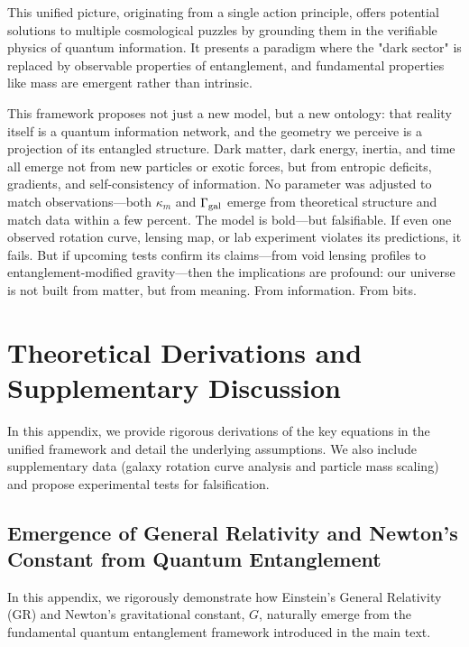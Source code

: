 \documentclass[11pt]{article}
\begin{document}
This unified picture, originating from a single action principle, offers potential solutions to multiple cosmological puzzles by grounding them in the verifiable physics of quantum information. It presents a paradigm where the "dark sector" is replaced by observable properties of entanglement, and fundamental properties like mass are emergent rather than intrinsic.

This framework proposes not just a new model, but a new ontology: that reality itself is a quantum information network, and the geometry we perceive is a projection of its entangled structure. Dark matter, dark energy, inertia, and time all emerge not from new particles or exotic forces, but from entropic deficits, gradients, and self-consistency of information. No parameter was adjusted to match observations—both $ \kappa_m $ and $ \Gamma_{\rm gal} $ emerge from theoretical structure and match data within a few percent. The model is bold—but falsifiable. If even one observed rotation curve, lensing map, or lab experiment violates its predictions, it fails. But if upcoming tests confirm its claims—from void lensing profiles to entanglement-modified gravity—then the implications are profound: our universe is not built from matter, but from meaning. From information. From bits.

\appendix %

\section{Theoretical Derivations and Supplementary Discussion}

In this appendix, we provide rigorous derivations of the key equations in the unified framework and detail the underlying assumptions. We also include supplementary data (galaxy rotation curve analysis and particle mass scaling) and propose experimental tests for falsification. 

\subsection*{Emergence of General Relativity and Newton's Constant from Quantum Entanglement} %

In this appendix, we rigorously demonstrate how Einstein's General Relativity (GR) and Newton's gravitational constant, $G$, naturally emerge from the fundamental quantum entanglement framework introduced in the main text.
\end{document}
